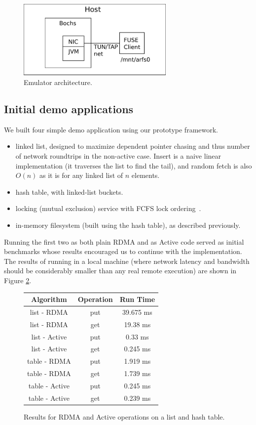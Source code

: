 \documentclass[10pt]{article}
\begin{document}
\begin{figure}
\centering
\includegraphics[width=3in]{fig/fig4.pdf}
\caption{Emulator architecture.}
\label{fig:fig4}
\end{figure}
  
\subsection{Initial demo applications}

We built four simple demo application using our prototype framework. 

\begin{itemize}
\item linked list, designed to maximize dependent pointer chasing and
  thus number of network roundtrips in the non-active case. Insert is
  a naive linear implementation (it traverses the list to find the
  tail), and random fetch is also $O(n)$ as it is for any linked list
  of $n$ elements.
\item hash table, with linked-list buckets.
\item locking (mutual exclusion) service with FCFS lock ordering~\cite{nic-basedatomic}.  
\item in-memory filesystem (built using the hash table), as described
  previously.
\end{itemize}

Running the first two as both plain RDMA and as Active code served as
initial benchmarks whose results encouraged us to continue with the
implementation. The results of running in a local machine (where
network latency and bandwidth should be considerably smaller than any
real remote execution) are shown in Figure \ref{res1}.

\begin{figure}[h!]
\center
\begin{tabular}{|ccc|}
\hline
Algorithm & Operation & Run Time\\
\hline
list - RDMA &  put & 39.675 ms \\
list - RDMA & get & 19.38 ms \\
\hline
list - Active & put & 0.33 ms \\
list - Active & get & 0.245 ms \\
\hline
\hline
table - RDMA  & put & 1.919 ms\\
table - RDMA   & get & 1.739 ms\\
\hline
table - Active  &put & 0.245 ms\\
table - Active & get & 0.239 ms\\
\hline
\end{tabular}
\caption{Results for RDMA and Active operations on a list and hash table.}
\label{res1}
\end{figure}
\end{document}
